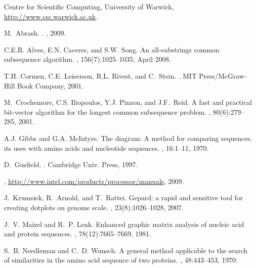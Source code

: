 \documentclass{IOS-Book-Article}     \usepackage{amsmath}
\theoremstyle{plain}
\theoremstyle{definition}
\begin{document}

\begin{thebibliography}{10}

{Centre for Scientific Computing, University of Warwick,
  \url{http://www.csc.warwick.ac.uk}}.

M.~Abrash.
.
, 2009.

C.E.R. Alves, E.N. Caceres, and S.W. Song.
\newblock An all-substrings common subsequence algorithm.
, 156(7):1025--1035, April 2008.

T.H. Cormen, C.E. Leiserson, R.L. Rivest, and C.~Stein.
.
\newblock MIT Press/McGraw-Hill Book Company, 2001.

M.~Crochemore, C.S. Iliopoulos, Y.J. Pinzon, and J.F.~Reid.
\newblock A fast and practical bit-vector algorithm for the longest common
  subsequence problem.
, 80(6):279--285, 2001.

A.J. Gibbs and G.A. McIntyre.
\newblock The diagram: {A} method for comparing sequences. its uses with amino
  acids and nucleotide sequences.
, 16:1--11, 1970.

D.~Gusfield.
.
\newblock Cambridge Univ. Press, 1997.

, 
\newblock \url{http://www.intel.com/products/processor/manuals}, 2009.

J.~Krumsiek, R.~Arnold, and T.~Rattei.
\newblock Gepard: a rapid and sensitive tool for creating dotplots on genome
  scale.
, 23(8):1026--1028, 2007.

J.~V. Maizel and R.~P. Lenk.
\newblock Enhanced graphic matrix analysis of nucleic acid and protein
  sequences.
, 78(12):7665--7669,
  1981.

S.~B. Needleman and C.~D. Wunsch.
\newblock A general method applicable to the search of similarities in the
  amino acid sequence of two proteins.
, 48:443--453, 1970.


\end{thebibliography}
\end{document}
